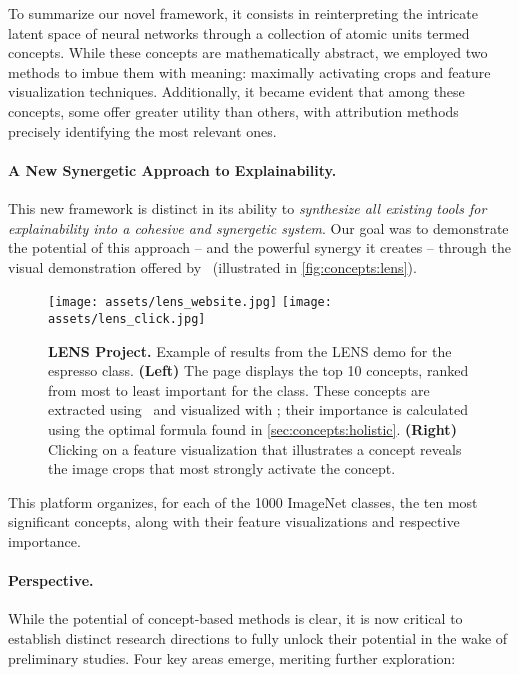 To summarize our novel framework, it consists in reinterpreting the intricate latent space of neural networks through a collection of atomic units termed concepts. While these concepts are mathematically abstract, we employed two methods to imbue them with meaning: maximally activating crops and feature visualization techniques. Additionally, it became evident that among these concepts, some offer greater utility than others, with attribution methods precisely identifying the most relevant ones.

\paragraph{A New Synergetic Approach to Explainability.} This new framework is distinct in its ability to \textit{synthesize all existing tools for explainability into a cohesive and synergetic system}. Our goal was to demonstrate the potential of this approach -- and the powerful synergy it creates -- through the visual demonstration offered by \Lens~(illustrated in \autoref{fig:concepts:lens}).

\begin{figure}[ht]
    \centering
    \texttt{[image: assets/lens\_website.jpg]}
    \texttt{[image: assets/lens\_click.jpg]}
    \caption{\textbf{LENS Project.} Example of results from the LENS demo for the espresso class. \textbf{(Left)} The page displays the top 10 concepts, ranked from most to least important for the class. These concepts are extracted using \craft~and visualized with \maco; their importance is calculated using the optimal formula found in \autoref{sec:concepts:holistic}. \textbf{(Right)} Clicking on a feature visualization that illustrates a concept reveals the image crops that most strongly activate the concept.}
    \label{fig:concepts:lens}
\end{figure}

This platform organizes, for each of the 1000 ImageNet classes, the ten most significant concepts, along with their feature visualizations and respective importance. 

\paragraph{Perspective.} While the potential of concept-based methods is clear, it is now critical to establish distinct research directions to fully unlock their potential in the wake of preliminary studies. Four key areas emerge, meriting further exploration:

